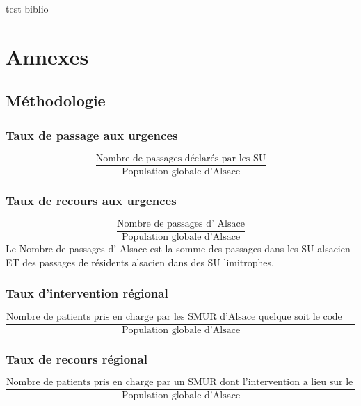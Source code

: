 \documentclass[12pt,english,french]{report}\usepackage{graphicx, color}
\begin{document}
test biblio \cite{1}
\part{Annexes}
\appendix
\chapter{Méthodologie}


\section*{Taux de passage aux urgences}
  \begin{displaymath}
    \frac{\text{Nombre de passages déclarés par les SU}}{\text{Population globale d'Alsace}}
  \end{displaymath}

\section*{Taux de recours aux urgences}
\begin{displaymath}
    \frac{\text{Nombre de passages d' Alsace}}{\text{Population globale d'Alsace}}
  \end{displaymath}
Le Nombre de passages d' Alsace est la somme des passages dans les SU alsacien ET des passages de résidents alsacien dans des SU limitrophes.

\section*{Taux d'intervention régional}
\begin{displaymath}
    \frac{\text{Nombre de patients pris en charge par les SMUR d'Alsace quelque soit le code postal du lieu d'intervention}}{\text{Population globale d'Alsace}}
  \end{displaymath}

\section*{Taux de recours régional}
\begin{displaymath}
    \frac{\text{Nombre de patients pris en charge par un SMUR dont l'intervention a lieu sur le territoire régional }}{\text{Population globale d'Alsace}}
  \end{displaymath}
\end{document}
